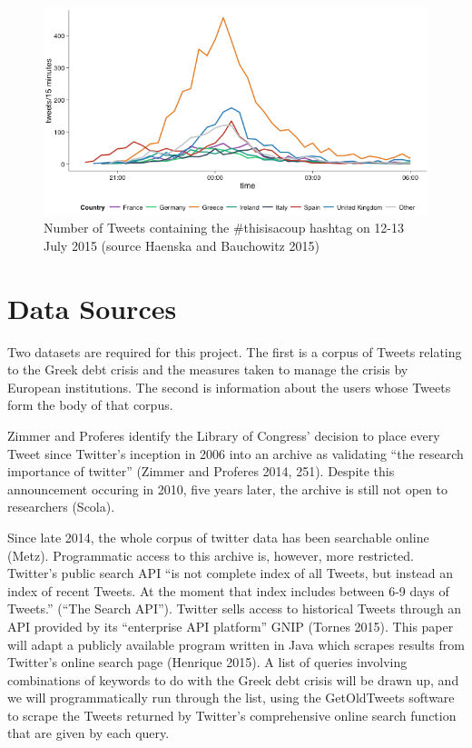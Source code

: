 \documentclass[]{article}
\begin{document}
\begin{figure}[htbp]
\centering
\includegraphics{img/Greece-twitter-2.png}
\caption{Number of Tweets containing the \#thisisacoup hashtag on 12-13
July 2015 (source Haenska and Bauchowitz 2015)}
\end{figure}

\section{Data Sources}\label{data-sources}

Two datasets are required for this project. The first is a corpus of
Tweets relating to the Greek debt crisis and the measures taken to
manage the crisis by European institutions. The second is information
about the users whose Tweets form the body of that corpus.

Zimmer and Proferes identify the Library of Congress' decision to place
every Tweet since Twitter's inception in 2006 into an archive as
validating ``the research importance of twitter'' (Zimmer and Proferes
2014, 251). Despite this announcement occuring in 2010, five years
later, the archive is still not open to researchers (Scola).

Since late 2014, the whole corpus of twitter data has been searchable
online (Metz). Programmatic access to this archive is, however, more
restricted. Twitter's public search API ``is not complete index of all
Tweets, but instead an index of recent Tweets. At the moment that index
includes between 6-9 days of Tweets.'' (``The Search API''). Twitter
sells access to historical Tweets through an API provided by its
``enterprise API platform'' GNIP (Tornes 2015). This paper will adapt a
publicly available program written in Java which scrapes results from
Twitter's online search page (Henrique 2015). A list of queries
involving combinations of keywords to do with the Greek debt crisis will
be drawn up, and we will programmatically run through the list, using
the GetOldTweets software to scrape the Tweets returned by Twitter's
comprehensive online search function that are given by each query.
\end{document}
